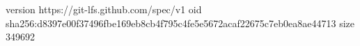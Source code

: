 version https://git-lfs.github.com/spec/v1
oid sha256:d8397e00f37496fbe169eb8cb4f795c4fe5e5672acaf22675c7eb0ea8ae44713
size 349692
